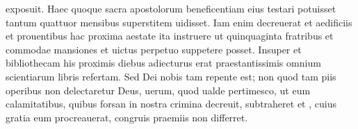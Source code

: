 \documentclass[a5paper,twoside]{article}
\begin{document}
 exposuit.  Haec quoque sacra apostolorum  beneficentiam eius testari potuisset  tantum quattuor mensibus superstitem uidisset. Iam enim decreuerat et aedificiis et prouentibus hac proxima aestate ita  instruere ut quinquaginta fratribus et commodae mansiones et  uictus perpetuo suppetere posset.  Insuper et bibliothecam his proximis diebus adiecturus erat praestantissimis omnium scientiarum libris  refertam.  Sed Dei  nobis tam repente  est; non quod tam piis operibus non delectaretur Deus, uerum, quod ualde pertimesco, ut eum calamitatibus, quibus forsan in nostra crimina  decreuit,  subtraheret et , cuius gratia eum procreauerat, congruis praemiis  non differret.
\end{document}
